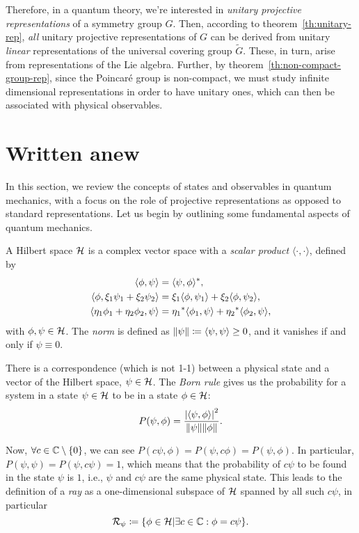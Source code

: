 Therefore, in a quantum theory, we're interested in \emph{unitary projective representations} of a symmetry group $G$. Then, according to theorem~\ref{th:unitary-rep}, \emph{all} unitary projective representations of $G$ can be derived from unitary \emph{linear} representations of the universal covering group $\tilde{G}$. These, in turn, arise from representations of the Lie algebra. Further, by theorem~\ref{th:non-compact-group-rep}, since the Poincaré group is non-compact, we must study infinite dimensional representations in order to have unitary ones, which can then be associated with physical observables.

\section{Written anew}
In this section, we review the concepts of states and observables in quantum mechanics, with a focus on the role of projective representations as opposed to standard representations. Let us begin by outlining some fundamental aspects of quantum mechanics.

A Hilbert space $\mathcal{H}$ is a complex vector space with a \emph{scalar product} $\langle \cdot, \cdot \rangle$, defined by
    \begin{subequations}\label{eq:scalar-product}
        \begin{align}
        \langle \phi, \psi \rangle &= \langle \psi, \phi \rangle^* , \\
        \langle \phi, \xi_1 \psi_1 + \xi_2 \psi_2 \rangle &= \xi_1 \langle \phi, \psi_1 \rangle + \xi_2 \langle \phi, \psi_2 \rangle ,\\
        \langle \eta_1 \phi_1 + \eta_2 \phi_2, \psi \rangle &= {\eta_1}^* \langle \phi_1, \psi \rangle + {\eta_2}^* \langle \phi_2, \psi \rangle ,
        \end{align}
        \end{subequations}
with $\phi,\psi \in \mathcal{H}$. The \emph{norm} is defined as $\lVert\psi\rVert \coloneq \langle \psi, \psi \rangle \geq 0$, and it vanishes if and only if $\psi \equiv 0$.

There is a correspondence (which is not 1-1) between a physical state and a vector of the Hilbert space, $\psi \in \mathcal{H}$. The \emph{Born rule} gives us the probability for a system in a state $\psi \in \mathcal{H}$ to be in a state $\phi \in \mathcal{H}$:
\begin{equation}
    P(\psi, \phi) = \frac{\abs{\langle \psi, \phi \rangle}^2}{\lVert\psi\rVert\lVert\phi\rVert} .
\end{equation}

Now, $\forall c \in \mathbb{C} \setminus \{0\}$, we can see $P(c\psi, \phi) = P(\psi, c\phi) = P(\psi,\phi)$. In particular, $P(\psi,\psi) = P(\psi, c\psi) = 1$, which means that the probability of $c \psi$ to be found in the state $\psi$ is $1$, i.e., $\psi$ and $c\psi$ are the same physical state. This leads to the definition of a \emph{ray} as a one-dimensional subspace of $\mathcal{H}$ spanned by all such $c\psi$, in particular
\begin{equation}
    \mathcal{R}_\psi \coloneq \{ \phi \in \mathcal{H} | \exists c \in \mathbb{C} : \phi = c \psi \} .
\end{equation}

